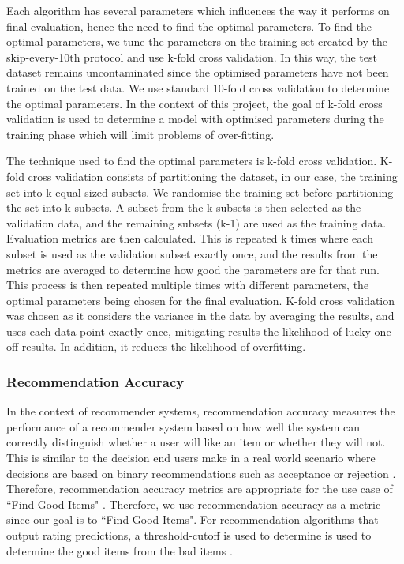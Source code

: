 Each algorithm has several parameters which influences the way it performs on final evaluation, hence the need to find the optimal parameters. To find the optimal parameters, we tune the parameters on the training set created by the skip-every-10th protocol and use k-fold cross validation. In this way, the test dataset remains uncontaminated since the optimised parameters have not been trained on the test data. 
We use standard 10-fold cross validation to determine the optimal parameters. In the context of this project, the goal of k-fold cross validation is used to determine a model with optimised parameters during the training phase which will limit problems of over-fitting. 

The technique used to find the optimal parameters is k-fold cross validation. K-fold cross validation consists of partitioning the dataset, in our case, the training set into k equal sized subsets. We randomise the training set before partitioning the set into k subsets. A subset from the k subsets is then selected as the validation data, and the remaining subsets (k-1) are used as the training data. Evaluation metrics are then calculated. This is repeated k times where each subset is used as the validation subset exactly once, and the results from the metrics are averaged to determine how good the parameters are for that run. This process is then repeated multiple times with different parameters, the optimal parameters being chosen for the final evaluation. K-fold cross validation was chosen as it considers the variance in the data by averaging the results, and uses each data point exactly once, mitigating results the likelihood of lucky one-off results. In addition, it reduces the likelihood of overfitting. 

\subsubsection{Recommendation Accuracy}

In the context of recommender systems, recommendation accuracy measures the performance of a recommender system based on how well the system can correctly distinguish whether a user will like an item or whether they will not. This is similar to the decision end users make in a real world scenario where decisions are based on binary recommendations such as acceptance or rejection \cite{zhang}. Therefore, recommendation accuracy metrics are appropriate for the use case of ``Find Good Items" \cite{evaluation}. Therefore, we use recommendation accuracy as a metric since our goal is to ``Find Good Items". For recommendation algorithms that output rating predictions, a threshold-cutoff is used to determine is used to determine the good items from the bad items \cite{zhang}.

